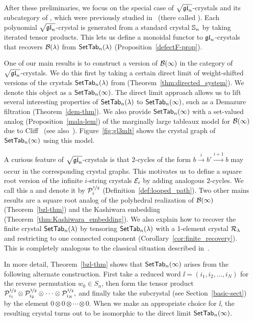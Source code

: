 \documentclass[11pt]{article}
\begin{document}
After these preliminaries, we focus on the special case of  $\sqrt{\mathfrak{gl}_n}$-crystals and its subcategory of , which were previously studied in~\cite{MT2023,MTY,Yu23} (there called ). 
Each polynomial $\sqrt{\mathfrak{gl}_n}$-crystal is generated from a standard crystal $\mathbb{S}_n$ by taking iterated tensor products.
This lets us define a monoidal functor to $\mathfrak{gl}_n$-crystals that recovers $\mathcal{B}(\lambda)$ from $\mathsf{SetTab}_n(\lambda)$ (Proposition~\ref{defectF-prop}).

One of our main results is to construct a version of $\mathcal{B}(\infty)$ in the category of $\sqrt{\mathfrak{gl}_n}$-crystals. 
We do this first by taking a certain direct limit 
of weight-shifted versions of the crystals
$\mathsf{SetTab}_n(\lambda)$ from \cite{Yu23} (Theorem~\ref{thm:directed_system}). 
We denote this object as a $\mathsf{SetTab}_n(\infty)$.
The direct limit approach 
allows us to lift several  interesting properties
of $\mathsf{SetTab}_n(\lambda)$ to $\mathsf{SetTab}_n(\infty)$,
such as a Demazure filtration (Theorem~\ref{dem-thm}).
We also provide $\mathsf{SetTab}_n(\infty)$ with a set-valued analog (Proposition~\ref{mala-lem}) of the marginally large tableaux model  for $\mathcal{B}(\infty)$ due to Cliff~\cite{Cliff98} (see also~\cite{HL08}).
Figure~\ref{fig:gl3mlt} shows the crystal graph of $\mathsf{SetTab}_n(\infty)$ using this model.

A curious feature of $\sqrt{\mathfrak{gl}_n}$-crystals
is that $2$-cycles of the form $b \xrightarrow[\hspace{10pt}]{i} b' \xrightarrow[\hspace{10pt}]{i+1} b$  may occur in the 
corresponding crystal graphs. 
This motivates us to define a square root version of the infinite $i$-string crystals $\mathcal E_i$ by adding analogous $2$-cycles.
We call this a  and denote it by $\mathcal{P}^{\nicefrac{1}{2}}_i$ (Definition~\ref{def:looped_path}).
Two other mains results are a square root analog of the polyhedral realization of $\mathcal{B}(\infty)$ (Theorem~\ref{bzl-thm}) and the Kashiwara embedding (Theorem~\ref{thm:Kashiwara_embedding}).
We also explain how to recover the finite crystal $\mathsf{SetTab}_n(\lambda)$ 
by tensoring $\mathsf{SetTab}_n(\lambda)$ with a 1-element crystal $\mathcal{R}_\lambda$
and restricting to one connected component (Corollary~\ref{cor:finite_recovery}). This is completely
analogous to the classical situation described in~\cite[Thm.~5]{Kashiwara91}.

In more detail, Theorem~\ref{bzl-thm} shows that $\mathsf{SetTab}_n(\infty)$ arises from the following alternate construction.
First take a reduced word $\ii=(i_1,i_2,\dots,i_N)$ for the reverse permutation $w_0 \in S_n$, then form the tensor product
$\mathcal{P}^{\nicefrac{1}{2}}_{i_1}\otimes \mathcal{P}^{\nicefrac{1}{2}}_{i_2} \otimes \cdots \otimes \mathcal{P}^{\nicefrac{1}{2}}_{i_N},
$
and finally take the subcrystal  (see Section~\ref{basic-sect}) by the element $ 0\otimes 0 \otimes \cdots \otimes 0$. When we make an appropriate choice for $\ii$, the resulting crystal turns out to be isomorphic to the direct limit $\mathsf{SetTab}_n(\infty)$.
\end{document}
